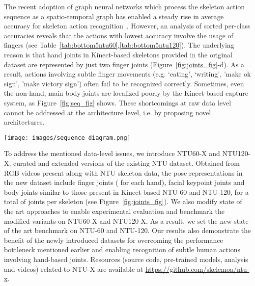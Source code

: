 \documentclass[sigconf,screen,prologue,table,dvipsnames]{acmart}
\begin{document}
The recent adoption of graph neural networks which process the skeleton action sequence as a  spatio-temporal graph has enabled a steady rise in average accuracy for skeleton action recognition~\cite{stgcn2018aaai,liu2020disentangling,cheng2020shiftgcn,song2020stronger,dstanet_accv2020}. However, an analysis of sorted per-class accuracies reveals that the actions with lowest accuracy involve the usage of fingers (see Table~\ref{tab:bottom5ntu60},\ref{tab:bottom5ntu120}). The underlying reason is that hand joints in Kinect-based skeletons provided in the original dataset are represented by just two finger joints (Figure~\ref{fig:joints_fig}-d). As a result, actions involving subtle finger movements (e.g. `eating', `writing', 'make ok sign', 'make victory sign') often fail to be recognized correctly. Sometimes, even the non-hand, main body joints are localized poorly by the Kinect-based capture system, as Figure~\ref{fig:seq_fig} shows. These shortcomings at raw data level cannot be addressed at the architecture level, i.e. by proposing novel architectures. 


\begin{figure*}[!t]
    \centering
    \texttt{[image: images/sequence\_diagram.png]}
    \caption{Sample skeletons from original NTU Kinect dataset (blue background) and proposed NTU-X dataset (pink background). Note that blurred RGB frame is included only for reference and is not part of skeleton data. The three classes mentioned - `eat meal', `writing' and `reading' are few of the most confused classes for NTU dataset (see Table~\ref{tab:bottom5ntu60}). As the zoomed insets illustrate, the quality of joints captured by NTU-X dataset is better compared to the original NTU dataset.}
    \label{fig:seq_fig}
\end{figure*}

To address the mentioned data-level issues, we introduce NTU60-X and NTU120-X, curated and extended versions of the existing NTU  dataset. Obtained from RGB videos present along with NTU skeleton data, the pose representations in the new dataset include  finger joints ( for each hand),  facial keypoint joints and  body joints similar to those present in Kinect-based NTU-60 and NTU-120, for a total of  joints per skeleton (see Figure~\ref{fig:joints_fig}). We also modify state of the art approaches to enable experimental evaluation and benchmark the modified variants on NTU60-X and NTU120-X. As a result, we set the new state of the art benchmark on NTU-60 and NTU-120. Our results also demonstrate the benefit of the newly introduced datasets for overcoming the performance bottleneck mentioned earlier and enabling recognition of subtle human actions involving hand-based joints. 
Resources (source code, pre-trained models, analysis and videos) related to NTU-X are available at  \url{https://github.com/skelemoa/ntu-x}.
\end{document}
